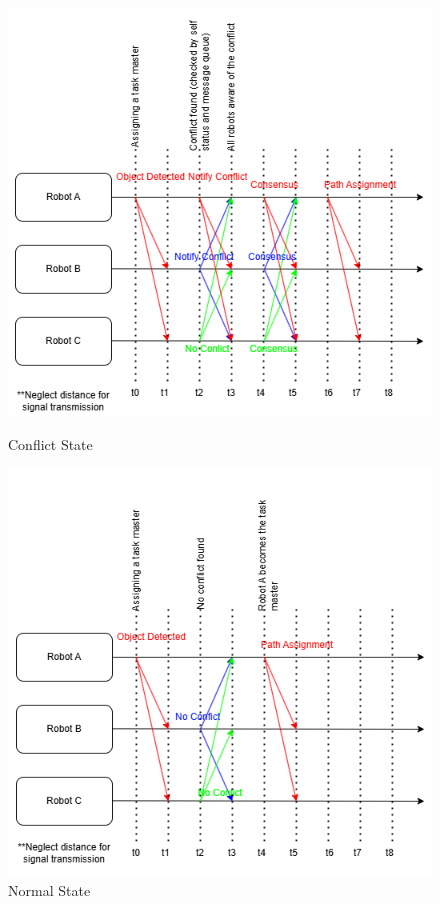 \begin{figure}[!htb]
        \includegraphics[width=\linewidth]{assets/images/communication/outputs/consensus_conflict.png}
        \caption{Conflict State}\label{fig:conflict-state}
    \endminipage\hfill
        \includegraphics[width=\linewidth]{assets/images/communication/outputs/consensus_normal.png}
        \caption{Normal State}\label{fig:normal-state}
    \endminipage\hfill
\end{figure}
